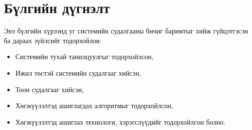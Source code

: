 \section{Бүлгийн дүгнэлт}

Энэ бүлгийн хүрээнд уг системийн судалгааны бичиг баримтыг хийж гүйцэтгэсэн ба дараах зүйлсийг тодорхойлов:
\begin{itemize}[label={--}]
    \renewcommand\labelitemi{--}
    \item Системийн тухай танилцуулгыг тодорхойлсон,
    \item Ижил төстэй системийн судалгааг хийсэн,
    \item Тоон судалгааг хийсэн,
    \item Хөгжүүлэлтэд ашиглагдах алгоритмыг тодорхойлсон,
    \item Хөгжүүлэлтэд ашиглах технологи, хэрэгслүүдийг тодорхойлсон болно.
\end{itemize}

